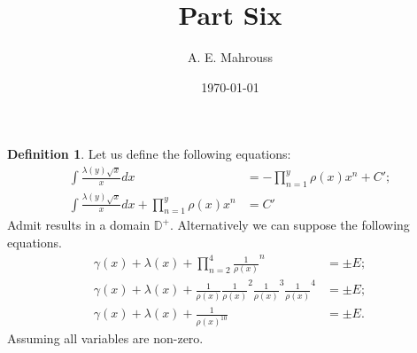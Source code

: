 \documentclass[10pt]{article}
\title{%
  \vspace{-1.5em}%
  \large\textbf{Part Six}%
}
\author{A. E. Mahrouss}
\date{\today}
\theoremstyle{plain}
\theoremstyle{definition}
\newtheorem{definition}[theorem]{Definition}
\theoremstyle{remark}
\begin{document}
\begin{definition}
	Let us define the following equations:
	\begin{align*}
		\int \frac{\lambda(y) \sqrt{x}}{x} dx &= - \prod_{n=1}^{y}\rho(x) x^{n} + C';\\
		\int \frac{\lambda(y) \sqrt{x}}{x} dx + \prod_{n=1}^{y}\rho(x) x^{n} &= C'
	\end{align*}
	Admit results in a domain $\mathbb{D}^{+}$. Alternatively we can suppose the following equations.
	\begin{align*}
		\gamma(x)+\lambda(x) + \prod_{n=2}^{4}\frac{1}{\rho(x)}^{n} &= \pm E;\\
		\gamma(x)+\lambda(x) + \frac{1}{\rho(x)} \frac{1}{\rho(x)}^{2} \frac{1}{\rho(x)}^{3} \frac{1}{\rho(x)}^{4} &= \pm E;\\
		\gamma(x)+\lambda(x) + \frac{1}{\rho(x)^{10}} &= \pm E.
	\end{align*}
	Assuming all variables are non-zero.
\end{definition}

\nocite{*}


\end{document}
